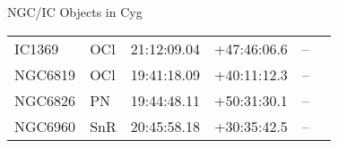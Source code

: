\begin{block}{NGC/IC Objects in Cyg}
  \centering
  \begin{tabularx}{\textwidth}{llrrll} 
    IC1369 & OCl & 21:12:09.04 & +47:46:06.6  & -- \\ 
    NGC6819 & OCl & 19:41:18.09 & +40:11:12.3  & -- \\ 
    NGC6826 & PN & 19:44:48.11 & +50:31:30.1  & -- \\ 
    NGC6960 & SnR & 20:45:58.18 & +30:35:42.5  & -- \\ 
  \end{tabularx}
\end{block}